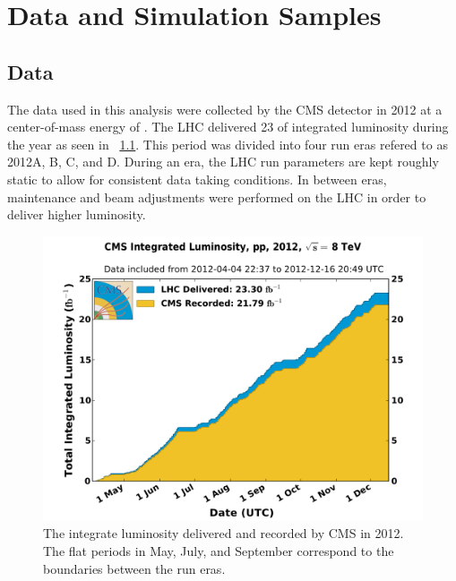 \chapter{Data and Simulation Samples}
\label{chatper:data_and_mc_samples}

\section{Data}

The data used in this analysis were collected by the CMS detector in 2012 at a
center-of-mass energy of \rootseight. The LHC delivered 23 \fbinv of integrated
luminosity during the year as seen in \FIG~\ref{fig:2012_luminosity}. This
period was divided into four run eras refered to as 2012A, B, C, and D. During
an era, the LHC run parameters are kept roughly static to allow for consistent
data taking conditions. In between eras, maintenance and beam adjustments were
performed on the LHC in order to deliver higher luminosity.

\begin{figure}[!htbp]
    \centering
    \includegraphics[width=\textwidth]{figures/2012_lumi.pdf}
    \caption[
        The integrate luminosity delivered and recorded by CMS in 2012
    ]{
        The integrate luminosity delivered and recorded by CMS in 2012. The
        flat periods in May, July, and September correspond to the boundaries
        between the run eras.
    }
    \label{fig:2012_luminosity}
\end{figure}


